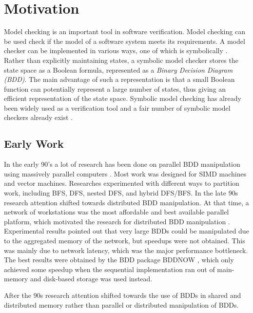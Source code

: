 \chapter{Motivation}

Model checking is an important tool in software verification. Model checking can be used check if the model of a software system meets its requirements. A model checker can be implemented in various ways, one of which is symbolically \cite{mcmillan1993symbolic, clarke1996symbolic}. Rather than explicitly maintaining states, a symbolic model checker stores the state space as a Boolean formula, represented as a \emph{Binary Decision Diagram (BDD)}. The main advantage of such a representation is that a small Boolean function can potentially represent a large number of states, thus giving an efficient representation of the state space. Symbolic model checking has already been widely used as a verification tool and a fair number of symbolic model checkers already exist \cite{cimatti2000nusmv, marrying}. 

\section{Early Work}
In the early 90's a lot of research has been done on parallel BDD manipulation using massively parallel computers \cite{BDDNOW:parallel_bdd_package, 545652, Stornetta96implementationof, BDDNOW:parallel_bdd_package}. Most work was designed for SIMD machines and vector machines. Researches experimented with different ways to partition work, including BFS, DFS, nested DFS, and hybrid DFS/BFS. In the late 90s research attention shifted towards distributed BDD manipulation. At that time, a network of workstations was the most affordable and best available parallel platform, which motivated the research for distributed BDD manipulation \cite{BDDNOW:parallel_bdd_package}. Experimental results pointed out that very large BDDs could be manipulated due to the aggregated memory of the network, but speedups were not obtained. This was mainly due to network latency, which was the major performance bottleneck. The best results were obtained by the BDD package BDDNOW \cite{BDDNOW:parallel_bdd_package}, which only achieved some speedup when the sequential implementation ran out of main-memory and disk-based storage was used instead.

After the 90s research attention shifted towards the use of BDDs in shared and distributed memory rather than parallel or distributed manipulation of BDDs.

